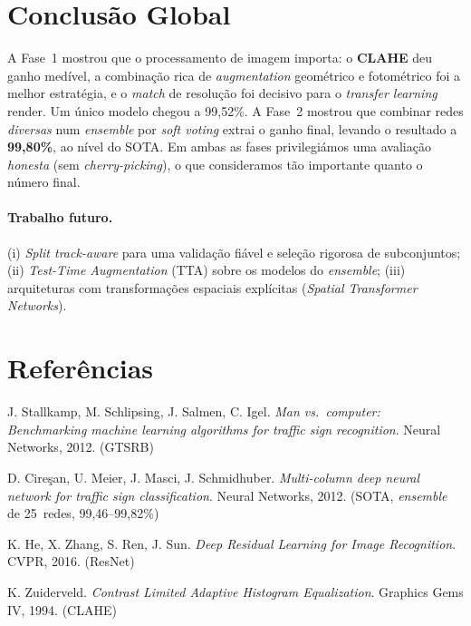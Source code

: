 \documentclass[11pt,a4paper]{article}
\begin{document}
\section{Conclusão Global}

A Fase~1 mostrou que o processamento de imagem importa: o \textbf{CLAHE} deu ganho medível,
a combinação rica de \emph{augmentation} geométrico e fotométrico foi a melhor estratégia,
e o \emph{match} de resolução foi decisivo para o \emph{transfer learning} render. Um único
modelo chegou a 99{,}52\%. A Fase~2 mostrou que combinar redes \emph{diversas} num
\emph{ensemble} por \emph{soft voting} extrai o ganho final, levando o resultado a
\textbf{99{,}80\%}, ao nível do SOTA. Em ambas as fases privilegiámos uma avaliação
\emph{honesta} (sem \emph{cherry-picking}), o que consideramos tão importante quanto o
número final.

\paragraph{Trabalho futuro.} (i) \emph{Split track-aware} para uma validação fiável e
seleção rigorosa de subconjuntos; (ii) \emph{Test-Time Augmentation} (TTA) sobre os modelos
do \emph{ensemble}; (iii) arquiteturas com transformações espaciais explícitas
(\emph{Spatial Transformer Networks}).

\section*{Referências}

\begin{enumerate}[nosep,label={[\arabic*]}]
  \item J. Stallkamp, M. Schlipsing, J. Salmen, C. Igel.
  \emph{Man vs.\ computer: Benchmarking machine learning algorithms for traffic sign
  recognition}. Neural Networks, 2012. (GTSRB)
  \item D. Cireşan, U. Meier, J. Masci, J. Schmidhuber.
  \emph{Multi-column deep neural network for traffic sign classification}.
  Neural Networks, 2012. (SOTA, \emph{ensemble} de 25~redes, 99{,}46--99{,}82\%)
  \item K. He, X. Zhang, S. Ren, J. Sun. \emph{Deep Residual Learning for Image
  Recognition}. CVPR, 2016. (ResNet)
  \item K. Zuiderveld. \emph{Contrast Limited Adaptive Histogram Equalization}.
  Graphics Gems IV, 1994. (CLAHE)
\end{enumerate}
\end{document}
